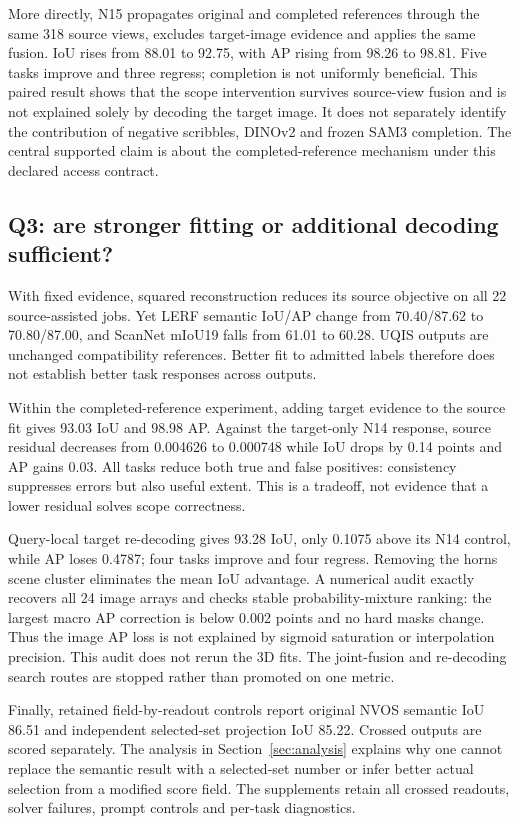 More directly, N15 propagates original and completed references through the
same 318 source views, excludes target-image evidence and applies the same
fusion. IoU rises from 88.01 to 92.75, with AP rising from 98.26 to 98.81.
Five tasks improve and three regress; completion is not uniformly beneficial.
This paired result shows that the scope intervention survives source-view
fusion and is not explained solely by decoding the target image. It does not
separately identify the contribution of negative scribbles, DINOv2 and frozen
SAM3 completion. The central supported claim is about the completed-reference
mechanism under this declared access contract.

\subsection{Q3: are stronger fitting or additional decoding sufficient?}
With fixed evidence, squared reconstruction reduces its source objective on
all 22 source-assisted jobs. Yet LERF semantic IoU/AP change from 70.40/87.62
to 70.80/87.00, and ScanNet mIoU19 falls from 61.01 to 60.28. UQIS outputs are
unchanged compatibility references. Better fit to admitted labels therefore
does not establish better task responses across outputs.

Within the completed-reference experiment, adding target evidence to the source
fit gives 93.03 IoU and 98.98 AP. Against the target-only N14 response,
source residual decreases from 0.004626 to 0.000748 while IoU drops by 0.14
points and AP gains 0.03. All tasks reduce both true and false positives:
consistency suppresses errors but also useful extent. This is a tradeoff,
not evidence that a lower residual solves scope correctness.

Query-local target re-decoding gives 93.28 IoU, only 0.1075 above its N14
control, while AP loses 0.4787; four tasks improve and four regress.
Removing the horns scene cluster eliminates the mean IoU advantage.
A numerical audit exactly recovers all 24 image arrays and checks stable
probability-mixture ranking: the largest macro AP correction is below 0.002
points and no hard masks change. Thus the image AP loss is not explained by
sigmoid saturation or interpolation precision. This audit does not rerun the
3D fits. The joint-fusion and re-decoding search routes are stopped rather than
promoted on one metric.

Finally, retained field-by-readout controls report original NVOS semantic IoU
86.51 and independent selected-set projection IoU 85.22. Crossed outputs are
scored separately. The analysis in Section~\ref{sec:analysis} explains why one
cannot replace the semantic result with a selected-set number or infer better
actual selection from a modified score field. The supplements retain all
crossed readouts, solver failures, prompt controls and per-task diagnostics.
